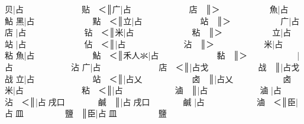 {\cjk{}{\cnsym{}　　　　　}贝}|{\cjk{}占{\cnsym{}　　　　　　　}贴{\cnsym{}　}＜}║{\cjk{}{\cnsym{}　　　　　　}广}|{\cjk{}占{\cnsym{}　　　　　　　}店{\cnsym{}　}}║{\cjk{}＞{\cnsym{}　　　　　　}魚}|{\cjk{}占{\cnsym{}　　　　　　　}鮎} 
{\cjk{}{\cnsym{}　　　　　}黑}|{\cjk{}占{\cnsym{}　　　　　　　}點{\cnsym{}　}＜}║{\cjk{}{\cnsym{}　　　　　　}立}|{\cjk{}占{\cnsym{}　　　　　　　}站{\cnsym{}　}}║{\cjk{}＞{\cnsym{}　　　　　　}广}|{\cjk{}占{\cnsym{}　　　　　　　}店} 
{\cjk{}{\cnsym{}　　　　　}}|{\cjk{}占{\cnsym{}　　　　　　　}钻{\cnsym{}　}＜}║{\cjk{}{\cnsym{}　　　　　　}米}|{\cjk{}占{\cnsym{}　　　　　　　}粘{\cnsym{}　}}║{\cjk{}＞{\cnsym{}　　　　　　}立}|{\cjk{}占{\cnsym{}　　　　　　　}站} 
{\cjk{}{\cnsym{}　　　　　}}|{\cjk{}占{\cnsym{}　　　　　　　}佔{\cnsym{}　}＜}║{\cjk{}{\cnsym{}　　　　　　}}|{\cjk{}占{\cnsym{}　　　　　　　}沾{\cnsym{}　}}║{\cjk{}＞{\cnsym{}　　　　　　}米}|{\cjk{}占{\cnsym{}　　　　　　　}粘} 
{\cjk{}{\cnsym{}　　　　　}魚}|{\cjk{}占{\cnsym{}　　　　　　　}鮎{\cnsym{}　}＜}║{\cjk{}{\cnsym{}　　　　}禾人氺}|{\cjk{}占{\cnsym{}　　　　　　　}黏{\cnsym{}　}}║{\cjk{}＞{\cnsym{}　　　　　　}}|{\cjk{}占{\cnsym{}　　　　　　　}沾} 
{\cjk{}{\cnsym{}　　　　　}广}|{\cjk{}占{\cnsym{}　　　　　　　}店{\cnsym{}　}＜}║{\cjk{}{\cnsym{}　　　　　　　}}|{\cjk{}占戈{\cnsym{}　　　　　　}战{\cnsym{}　}}║{\cjk{}{\cnsym{}　　　　　　　　}}|{\cjk{}占戈{\cnsym{}　　　　　　}战} 
{\cjk{}{\cnsym{}　　　　　}立}|{\cjk{}占{\cnsym{}　　　　　　　}站{\cnsym{}　}＜}║{\cjk{}{\cnsym{}　　　　　　　}}|{\cjk{}占乂{\cnsym{}　　　　　　}卤{\cnsym{}　}}║{\cjk{}{\cnsym{}　　　　　　　　}}|{\cjk{}占乂{\cnsym{}　　　　　　}卤} 
{\cjk{}{\cnsym{}　　　　　}米}|{\cjk{}占{\cnsym{}　　　　　　　}粘{\cnsym{}　}＜}║{\cjk{}{\cnsym{}　　　　　　}}|{\cjk{}占{\cnxb{}𠂭}{\cnsym{}　　　　　　}滷{\cnsym{}　}}║{\cjk{}{\cnsym{}　　　　　　　}}|{\cjk{}占{\cnxb{}𠂭}{\cnsym{}　　　　　　}滷} 
{\cjk{}{\cnsym{}　　　　　}}|{\cjk{}占{\cnsym{}　　　　　　　}沾{\cnsym{}　}＜}║{\cjk{}{\cnsym{}　　　　　　　}}|{\cjk{}占{\cnxb{}𠂭}戌口{\cnsym{}　　　　}鹹{\cnsym{}　}}║{\cjk{}{\cnsym{}　　　　　　　　}}|{\cjk{}占{\cnxb{}𠂭}戌口{\cnsym{}　　　　}鹹} 
{\cjk{}{\cnsym{}　　　　　}}|{\cjk{}占{\cnxb{}𠂭}{\cnsym{}　　　　　　}滷{\cnsym{}　}＜}║{\cjk{}{\cnsym{}　　　　　}臣}|{\cjk{}占{\cnxb{}𠂭}皿{\cnsym{}　　　　　}鹽{\cnsym{}　}}║{\cjk{}{\cnsym{}　　　　　　}臣}|{\cjk{}占{\cnxb{}𠂭}皿{\cnsym{}　　　　　}鹽} 

